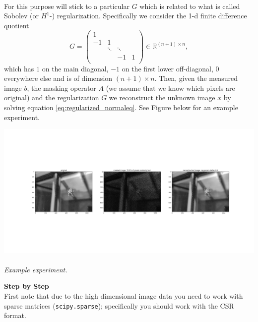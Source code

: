 {	~\\
	For this purpose will stick to a particular $G$ which is related to what is called Sobolev (or $H^1$-) regularization. Specifically we consider the 1-d finite difference quotient
	\begin{equation}\label{eq:G}
	 G = \begin{pmatrix}
	  1 & &  &  \\
	  -1 & 1 &   &\\
	   &\ddots&\ddots & \\
	   & &-1 & 1\\
	 \end{pmatrix} \in \mathbb{R}^{(n+1)\times n},
	\end{equation}
	which has $1$ on the main diagonal, $-1$ on the first lower off-diagonal, $0$ everywhere else and is of dimension $(n+1)\times n$. Then, given the measured image $b$, the masking operator $A$ (we assume that we know which pixels are original) and the regularization $G$ we reconstruct the unknown image $x$ by solving equation \eqref{eq:regularized_normaleq}. See Figure below for an example experiment.
}
\begin{center}
	\includegraphics[trim={7cm 10.2cm 7cm 10.2cm},clip, width=1.\textwidth]{Image_Inpainting}\\~\\
	\textit{Example experiment.}
\end{center}
\newpage
\textbf{Step by Step}\\
First note that due to the high dimensional image data you need to work with sparse matrices (\texttt{scipy.sparse}); specifically you should work with the CSR format.
